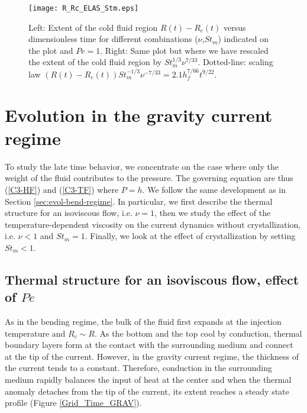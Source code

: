 \begin{figure}
  \begin{center}
    \graphicspath{ {/Users/thorey/Documents/These/Projet/Refroidissement/Skin_Model/Figure/JFM_V13/} }
    \texttt{[image: R\_Rc\_ELAS\_Stm.eps]}
    \caption{Left:  Extent  of  the cold  fluid  region  $R(t)-R_c(t)$
      versus   dimensionless    time   for    different   combinations
      ($\nu$,$St_m$) indicated  on the  plot and $Pe=1$.   Right: Same
      plot but  where we have  rescaled the  extent of the  cold fluid
      region  by  $St_m^{1/3}\nu^{7/33}$.   Dotted-line:  scaling  law
      $(R(t)-R_c(t))St_m^{-1/3}\nu^{-7/33}=                  2.1
      h_f^{7/66}t^{9/22}$.}
    \label{R_Rc_ELAS_Stm}
  \end{center}
\end{figure}


\section{Evolution in the gravity current regime}
\label{sec:evol-grav-curr-1}

To study the late time behavior, we concentrate on the case where only
the weight  of the fluid  contributes to the pressure.   The governing
equation  are thus  (\ref{C3-HF}) and  (\ref{C3-TF}) where  $P=h$.  We
follow      the     same      development  as      in     Section
\ref{sec:evol-bend-regime}.   In  particular,  we first  describe  the
thermal structure for an isoviscous flow, i.e. $\nu=1$, then we study
the effect of the temperature-dependent viscosity on the current
dynamics without crystallization, i.e.  $\nu<1$ and $St_m=1$. Finally,
we look at the effect of crystallization by setting $St_m<1$.

\subsection{Thermal structure for an isoviscous flow, effect of $Pe$}
\label{sec:thermal-structure-an-1}
  
As in the bending  regime, the bulk of the fluid  first expands at the
injection temperature and $R_c \sim R$.  As the bottom and the top cool
by conduction,  thermal boundary layers  form at the contact  with the
surrounding medium and connect at the  tip of the current. However, in
the gravity  current regime, the thickness  of the current tends  to a
constant.   Therefore, conduction  in the  surrounding medium  rapidly
balances the input of heat at  the center and when the thermal anomaly
detaches from the tip of the current, its extent reaches a steady state
profile (Figure \ref{Grid_Time_GRAV}).

